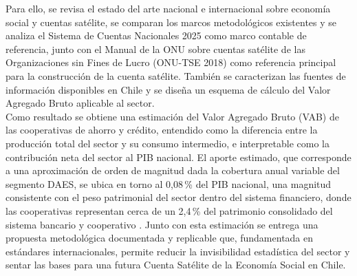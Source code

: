 Para ello, se revisa el estado del arte nacional e internacional sobre economía social y cuentas satélite, se comparan los marcos metodológicos existentes y se analiza el Sistema de Cuentas Nacionales 2025 \cite{united_nations_system_2025} como marco contable de referencia, junto con el Manual de la ONU sobre cuentas satélite de las Organizaciones sin Fines de Lucro (ONU-TSE 2018) \cite{vereinte_nationen_satellite_2018} como referencia principal para la construcción de la cuenta satélite. También se caracterizan las fuentes de información disponibles en Chile y se diseña un esquema de cálculo del Valor Agregado Bruto aplicable al sector.\\
Como resultado se obtiene una estimación del Valor Agregado Bruto (VAB) de las cooperativas de
ahorro y crédito, entendido como la diferencia entre la producción total del sector y su consumo
intermedio, e interpretable como la contribución neta del sector al PIB nacional. El aporte estimado,
que corresponde a una aproximación de orden de magnitud dada la cobertura anual variable del
segmento DAES, se ubica en torno al 0,08\,\% del PIB nacional, una magnitud consistente con el peso
patrimonial del sector dentro del sistema financiero, donde las cooperativas representan cerca de un
2,4\,\% del patrimonio consolidado del sistema bancario y cooperativo \cite{comision_para_el_mercado_financiero_informe_2025}. Junto con esta
estimación se entrega una propuesta metodológica documentada y replicable que, fundamentada en
estándares internacionales, permite reducir la invisibilidad estadística del sector y sentar las bases
para una futura Cuenta Satélite de la Economía Social en Chile.
  \cleardoublepage
  \tableofcontents
  \cleardoublepage
  \listoffigures
  \cleardoublepage
  \listoftables
  \cleardoublepage
  \normalsize
